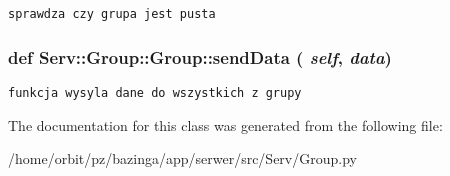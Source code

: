 \footnotesize\begin{verbatim}sprawdza czy grupa jest pusta

\end{verbatim}
\normalsize
 \hypertarget{class_serv_1_1_group_1_1_group_cbb0137781676208d4de16b90d8d9cc0}{
\subsubsection[{sendData}]{\setlength{\rightskip}{0pt plus 5cm}def Serv::Group::Group::sendData ( {\em self}, \/   {\em data})}}
\label{class_serv_1_1_group_1_1_group_cbb0137781676208d4de16b90d8d9cc0}




\footnotesize\begin{verbatim}funkcja wysyla dane do wszystkich z grupy

\end{verbatim}
\normalsize
 

The documentation for this class was generated from the following file:\begin{CompactItemize}
\item 
/home/orbit/pz/bazinga/app/serwer/src/Serv/Group.py\end{CompactItemize}
